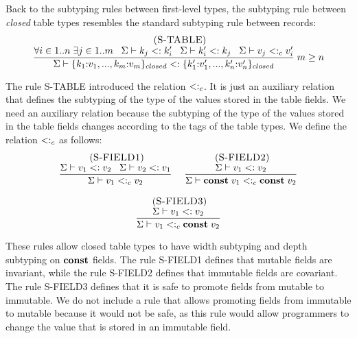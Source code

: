 Back to the subtyping rules between first-level types,
the subtyping rule between \emph{closed} table types resembles the
standard subtyping rule between records:
\[
\begin{array}{c}
\; (\textsc{S-TABLE})\\
\dfrac{\forall i \in 1..n \; \exists j \in 1..m \;\;\;
       \Sigma \vdash k_{j} <: k_{i}' \;\;\;
       \Sigma \vdash k_{i}' <: k_{j} \;\;\;
       \Sigma \vdash v_{j} <:_{c} v_{i}'}
      {\Sigma \vdash \{k_{1}{:}v_{1}, ..., k_{m}{:}v_{m}\}_{closed} <: \{k_{1}'{:}v_{1}', ..., k_{n}'{:}v_{n}'\}_{closed}} \; m \ge n
\end{array}
\]

The rule \textsc{S-TABLE} introduced the relation $<:_{c}$.
It is just an auxiliary relation that defines the subtyping of the
type of the values stored in the table fields.
We need an auxiliary relation because the subtyping of the
type of the values stored in the table fields changes according to
the tags of the table types.
We define the relation $<:_{c}$ as follows:
\[
\begin{array}{c}
\begin{array}{c}
\; (\textsc{S-FIELD1})\\
\dfrac{\Sigma \vdash v_{1} <: v_{2} \;\;\;
       \Sigma \vdash v_{2} <: v_{1}}
      {\Sigma \vdash v_{1} <:_{c} v_{2}}
\end{array}
\;
\begin{array}{c}
\; (\textsc{S-FIELD2})\\
\dfrac{\Sigma \vdash v_{1} <: v_{2}}
      {\Sigma \vdash \mathbf{const} \; v_{1} <:_{c} \mathbf{const} \; v_{2}}
\end{array}
\\ \\
\begin{array}{c}
\; (\textsc{S-FIELD3})\\
\dfrac{\Sigma \vdash v_{1} <: v_{2}}
      {\Sigma \vdash v_{1} <:_{c} \mathbf{const} \; v_{2}}
\end{array}
\end{array}
\]

These rules allow closed table types to have width subtyping
and depth subtyping on $\mathbf{const}$ fields.
The rule \textsc{S-FIELD1} defines that mutable fields are invariant,
while the rule \textsc{S-FIELD2} defines that immutable fields are covariant.
The rule \textsc{S-FIELD3} defines that it is safe to promote fields
from mutable to immutable.
We do not include a rule that allows promoting fields from immutable
to mutable because it would not be safe, as this rule would allow
programmers to change the value that is stored in an immutable field.

